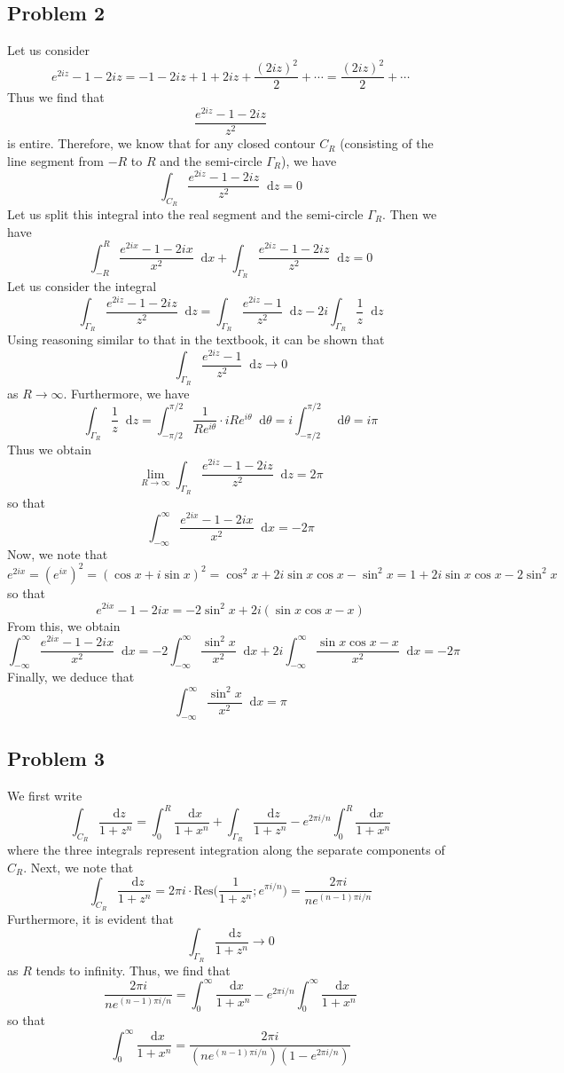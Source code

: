 \documentclass[12pt]{article}
\newcommand*\diff{\mathop{}\!\mathrm{d}}
\begin{document}
\subsection*{Problem 2}
Let us consider
\[
e^{2iz} - 1 - 2i z = - 1 - 2iz + 1 + 2i z + \frac{(2iz)^2}{2} + \cdots = \frac{(2iz)^2}{2} + \cdots
\] Thus we find that
\[
\frac{e^{2iz} - 1 - 2i z}{z^2}
\] is entire. Therefore, we know that for any closed contour $C_R$ (consisting of the line segment from $-R$ to $R$ and the semi-circle $\Gamma_R$), we have
\[
\int_{C_R} \frac{e^{2iz} - 1 - 2i z}{z^2} \diff z = 0
\] Let us split this integral into the real segment and the semi-circle $\Gamma_R$. Then we have
\[
\int_{-R}^R \frac{e^{2ix} - 1 - 2ix }{x^2} \diff x + \int_{\Gamma_R} \frac{e^{2iz} - 1 - 2i z}{z^2} \diff z = 0
\] Let us consider the integral
\[
 \int_{\Gamma_R} \frac{e^{2iz} - 1 - 2i z}{z^2} \diff z = \int_{\Gamma_R} \frac{e^{2iz} - 1}{z^2} \diff z - 2i\int_{\Gamma_R} \frac{1}{z} \diff z
\] Using reasoning similar to that in the textbook, it can be shown that
\[
\int_{\Gamma_R} \frac{e^{2iz} - 1}{z^2} \diff z \rightarrow 0
\] as $R \rightarrow \infty$. Furthermore, we have
\[
\int_{\Gamma_R} \frac{1}{z} \diff z = \int_{-\pi/2}^{\pi/2} \frac{1}{Re^{i\theta}} \cdot i Re^{i\theta} \diff \theta = i \int_{-\pi/2}^{\pi/2} \diff \theta = i \pi
\] Thus we obtain
\[
\lim_{R\rightarrow \infty}  \int_{\Gamma_R} \frac{e^{2iz} - 1 - 2i z}{z^2} \diff z = 2 \pi
\] so that
\[
 \int_{-\infty}^\infty \frac{e^{2ix} - 1 - 2ix }{x^2} \diff x = -2 \pi
\] Now, we note that
\[
e^{2ix} = (e^{ix})^2 = (\cos x + i \sin x)^2 = \cos^2 x + 2i\sin x \cos x - \sin^2 x = 1 + 2i\sin x \cos x - 2\sin^2 x
\] so that
\[
e^{2ix} - 1 - 2ix = -2\sin^2x + 2i(\sin x \cos x - x)
\] From this, we obtain
\[
 \int_{-\infty}^\infty \frac{e^{2ix} - 1 - 2ix }{x^2} \diff x = -2 \int_{-\infty}^\infty \frac{\sin^2x}{x^2} \diff x  + 2i \int_{-\infty}^\infty \frac{\sin x \cos x - x}{x^2} \diff x = -2\pi\]
 Finally, we deduce that
 \[
 \int_{-\infty}^\infty \frac{\sin^2x}{x^2} \diff x = \pi
 \]\newpage
\subsection*{Problem 3}
We first write
\[
\int_{C_R} \frac{\diff z}{1+z^n} = \int_0^R \frac{\diff x}{1+x^n} + \int_{\Gamma_R} \frac{\diff z}{1+z^n} - e^{2\pi i /n} \int_{0}^{R} \frac{\diff x}{1+ x^n}
\] where the three integrals represent integration along the separate components of $C_R$. Next, we note that
\[
\int_{C_R} \frac{\diff z}{1+z^n} = 2\pi i  \cdot \text{Res}\bigg(\frac{1}{1+z^n}; e^{\pi i / n}\bigg) =  \frac{2\pi i}{ne^{(n-1)\pi i/n}}
\] Furthermore, it is evident that
\[
\int_{\Gamma_R} \frac{\diff z}{1+z^n} \rightarrow 0
\] as $R$ tends to infinity. Thus, we find that
\[
\frac{2\pi i}{ne^{(n-1)\pi i/n}} = \int_0^\infty \frac{\diff x}{1+x^n} - e^{2\pi i /n} \int_{0}^{\infty} \frac{\diff x}{1+ x^n}
\] so that
\[
\int_0^\infty \frac{\diff x}{1+x^n} = \frac{2\pi i}{(ne^{(n-1)\pi i/n})(1-e^{2\pi i /n})}
\]
\newpage
\end{document}
